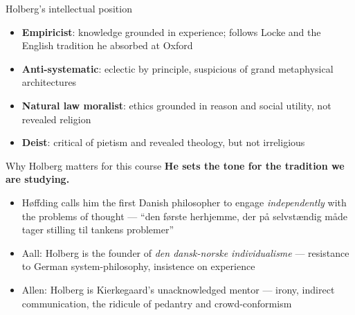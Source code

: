 \documentclass[aspectratio=169]{beamer}
\begin{document}

\begin{frame}{Holberg's intellectual position}
  \begin{itemize}
    \item \textbf{Empiricist}: knowledge grounded in experience; follows Locke and
      the English tradition he absorbed at Oxford
    \item \textbf{Anti-systematic}: eclectic by principle, suspicious of grand
      metaphysical architectures
    \item \textbf{Natural law moralist}: ethics grounded in reason and social
      utility, not revealed religion
    \item \textbf{Deist}: critical of pietism and revealed theology, but not
      irreligious
  \end{itemize}
\end{frame}


\begin{frame}{Why Holberg matters for this course}
  \textbf{He sets the tone for the tradition we are studying.}

  \medskip
  \begin{itemize}
    \item H\o ffding calls him the first Danish philosopher to engage \emph{independently}
      with the problems of thought --- ``\foreignlanguage{danish}{den første herhjemme,
      der på selvstændig måde tager stilling til tankens problemer}''
    \item Aall: Holberg is the founder of
      \emph{\foreignlanguage{danish}{den dansk-norske individualisme}} ---
      resistance to German system-philosophy, insistence on experience
    \item Allen: Holberg is Kierkegaard's unacknowledged mentor --- irony,
      indirect communication, the ridicule of pedantry and crowd-conformism
  \end{itemize}
\end{frame}

\end{document}
